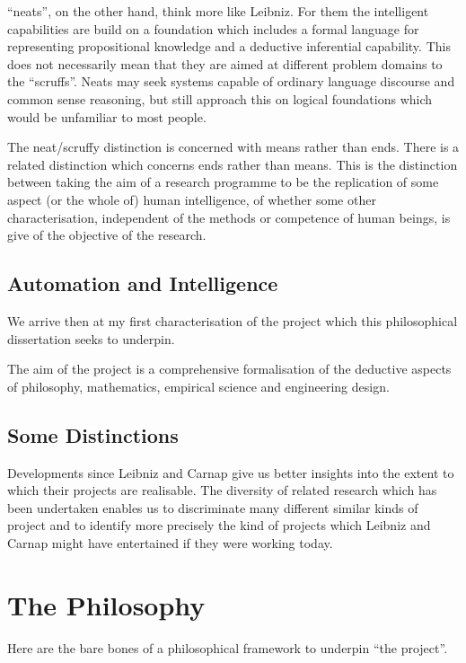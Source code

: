 ``neats'', on the other hand, think more like Leibniz.
For them the intelligent capabilities are build on a foundation which
includes a formal language for representing propositional knowledge
and a deductive inferential capability.
This does not necessarily mean that they are aimed at different
problem domains to the ``scruffs''.
Neats may seek systems capable of ordinary language discourse and
common sense reasoning, but still approach this on logical foundations
which would be unfamiliar to most people.

The neat/scruffy distinction is concerned with means rather than ends.
There is a related distinction which concerns ends rather than means.
This is the distinction between taking the aim of a research programme
to be the replication of some aspect (or the whole of) human
intelligence, of whether some other characterisation, independent of
the methods or competence of human beings, is give of the objective of
the research.

\subsection{Automation and Intelligence}\label{AutomationAndIntelligence}

We arrive then at my first characterisation of the project which this
philosophical dissertation seeks to underpin.

The aim of the project is a comprehensive formalisation of the
deductive aspects of philosophy, mathematics, empirical science and
engineering design.

\subsection{Some Distinctions}

Developments since Leibniz and Carnap give us better insights into
the extent to which their projects are realisable.
The diversity of related research which has been undertaken enables us
to discriminate many different similar kinds of project and to
identify more precisely the kind of projects which Leibniz and Carnap
might have entertained if they were working today.


\section{The Philosophy}\label{ThePhilosophy}

Here are the bare bones of a philosophical framework to underpin ``the project''.

